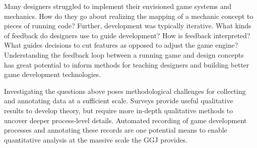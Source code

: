 \documentclass{sig-alternate}
\begin{document}
Many designers struggled to implement their envisioned game systems and mechanics. How do they go about realizing the mapping of a mechanic concept to pieces of running code? Further, development was typically iterative. What kinds of feedback do designers use to guide development? How is feedback interpreted? What guides decisions to cut features as opposed to adjust the game engine? Understanding the feedback loop between a running game and design concepts has great potential to inform methods for teaching designers and building better game development technologies.

Investigating the questions above poses methodological challenges for collecting and annotating data at a sufficient scale. Surveys provide useful qualitative results to develop theory, but require more in-depth qualitative methods to uncover deeper process-level details. Automated recording of game development processes and annotating these records are one potential means to enable quantitative analysis at the massive scale the GGJ provides.




\end{document}
